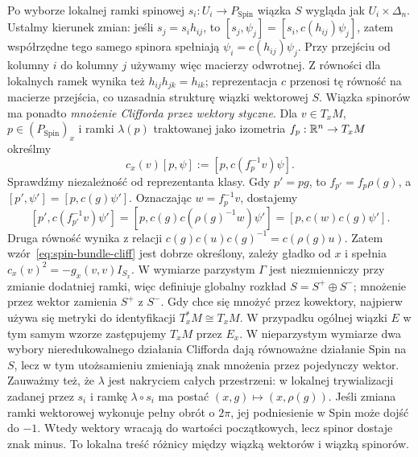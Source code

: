 Po wyborze lokalnej ramki spinowej $s_i:U_i\to P_{\mathrm{Spin}}$
wiązka $S$ wygląda jak $U_i\times\Delta_n$. Ustalmy kierunek
zmian: jeśli $s_j=s_i h_{ij}$, to
$[s_j,\psi_j]=[s_i,c(h_{ij})\psi_j]$, zatem współrzędne
tego samego spinora spełniają $\psi_i=c(h_{ij})\psi_j$.
Przy przejściu od kolumny $i$ do kolumny $j$ używamy więc
macierzy odwrotnej. Z równości dla lokalnych ramek wynika też
$h_{ij}h_{jk}=h_{ik}$; reprezentacja $c$ przenosi tę równość
na macierze przejścia, co uzasadnia strukturę wiązki wektorowej $S$.
Wiązka spinorów ma ponadto \emph{mnożenie Clifforda przez wektory
styczne}. Dla $v\in T_xM$, $p\in(P_{\mathrm{Spin}})_x$ i
ramki $\lambda(p)$ traktowanej jako izometria
$f_p:\mathbb{R}^n\to T_xM$ określmy
\begin{equation}\label{eq:spin-bundle-cliff}
 c_x(v)[p,\psi]
   :=[p,c(f_p^{-1}v)\psi].
\end{equation}
Sprawdźmy niezależność od reprezentanta klasy. Gdy $p'=pg$,
to $f_{p'}=f_p\rho(g)$, a $[p',\psi']=[p,c(g)\psi']$.
Oznaczając $w=f_p^{-1}v$, dostajemy
\[
 [p',c(f_{p'}^{-1}v)\psi']
 =[p,c(g)c(\rho(g)^{-1}w)\psi']
 =[p,c(w)c(g)\psi'].
\]
Druga równość wynika z relacji
$c(g)c(u)c(g)^{-1}=c(\rho(g)u)$.
Zatem wzór~\eqref{eq:spin-bundle-cliff} jest dobrze określony,
zależy gładko od $x$ i spełnia
$c_x(v)^2=-g_x(v,v)I_{S_x}$.
W wymiarze parzystym $\Gamma$ jest niezmienniczy przy zmianie
dodatniej ramki, więc definiuje globalny rozkład
$S=S^+\oplus S^-$; mnożenie przez wektor zamienia $S^+$ z $S^-$.
Gdy chce się mnożyć przez kowektory, najpierw używa się metryki
do identyfikacji $T_x^*M\cong T_xM$.
W przypadku ogólnej wiązki $E$ w tym samym wzorze zastępujemy
$T_xM$ przez $E_x$.
W nieparzystym wymiarze dwa wybory nieredukowalnego działania
Clifforda dają równoważne działanie Spin na $S$, lecz w tym
utożsamieniu zmieniają znak mnożenia przez pojedynczy wektor.
Zauważmy też, że $\lambda$ jest nakryciem całych przestrzeni:
w lokalnej trywializacji zadanej przez $s_i$ i ramkę $\lambda\circ s_i$
ma postać $(x,g)\mapsto(x,\rho(g))$.
Jeśli zmiana ramki wektorowej wykonuje pełny
obrót o $2\pi$, jej podniesienie w Spin
może dojść do $-1$. Wtedy wektory wracają
do wartości początkowych, lecz spinor dostaje
znak minus. To lokalna treść różnicy między
wiązką wektorów i wiązką spinorów.

